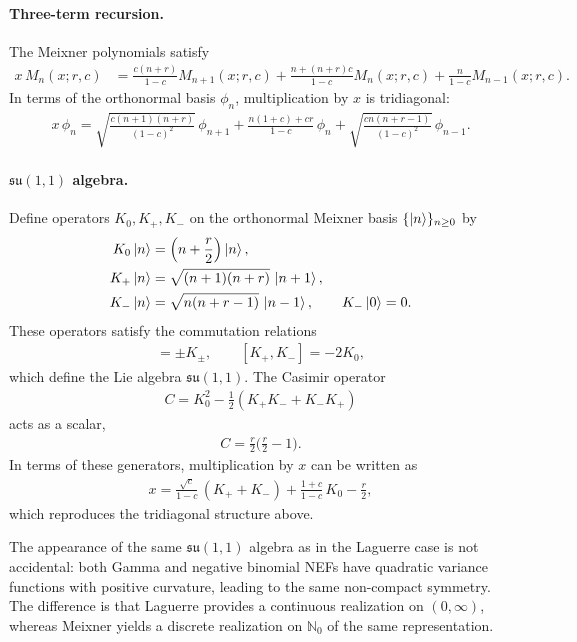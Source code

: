 \documentclass[a4paper,11pt]{article}
\numberwithin{equation}{section}
\theoremstyle{plain}
\theoremstyle{definition}
\theoremstyle{remark}
\newcommand{\1}{\ensuremath{\mathds{1}}\xspace}
\begin{document}
\paragraph{Three-term recursion.}
The Meixner polynomials satisfy
\begin{align}
x\,M_n(x;r,c)
&=
\frac{c(n+r)}{1-c} M_{n+1}(x;r,c)
+
\frac{n+(n+r)c}{1-c} M_n(x;r,c)
+
\frac{n}{1-c} M_{n-1}(x;r,c).
\end{align}
In terms of the orthonormal basis $\phi_n$, multiplication by $x$ is tridiagonal:
\begin{align}
x\,\phi_n
=
\sqrt{\frac{c(n+1)(n+r)}{(1-c)^2}}\,\phi_{n+1}
+
\frac{n(1+c)+cr}{1-c}\,\phi_n
+
\sqrt{\frac{c n(n+r-1)}{(1-c)^2}}\,\phi_{n-1}.
\end{align}
\paragraph{$\mathfrak{su}(1,1)$ algebra.}
Define operators $K_0,K_+,K_-$ on the orthonormal Meixner basis
$\{\ket{n}\}_{n\ge 0}$ by
\begin{align}
K_0\ket{n} &= \left(n+\frac{r}{2}\right)\ket{n},\\
K_+\ket{n} &= \sqrt{(n+1)(n+r)}\,\ket{n+1},\\
K_-\ket{n} &= \sqrt{n(n+r-1)}\,\ket{n-1},
\qquad K_-\ket{0}=0.
\end{align}
These operators satisfy the commutation relations
\begin{align}
[K_0,K_\pm]=\pm K_\pm,
\qquad
[K_+,K_-]=-2K_0,
\end{align}
which define the Lie algebra $\mathfrak{su}(1,1)$.
The Casimir operator
\begin{align}
C=K_0^2-\frac12(K_+K_-+K_-K_+)
\end{align}
acts as a scalar,
\begin{align}
C=\frac{r}{2}\Big(\frac{r}{2}-1\Big).
\end{align}
In terms of these generators, multiplication by $x$ can be written as
\begin{align}
x
=
\frac{\sqrt{c}}{1-c}\,(K_+ + K_-)
+
\frac{1+c}{1-c}\,K_0
-
\frac{r}{2},
\end{align}
which reproduces the tridiagonal structure above.

The appearance of the same $\mathfrak{su}(1,1)$ algebra as in the Laguerre case is not accidental:
both Gamma and negative binomial NEFs have quadratic variance functions with positive curvature,
leading to the same non-compact symmetry. 
The difference is that Laguerre provides a continuous realization on $(0,\infty)$,
whereas Meixner yields a discrete realization on $\mathbb{N}_0$ of the same representation.
\end{document}
